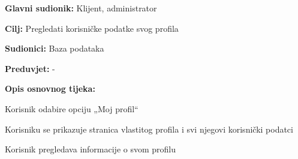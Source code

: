						\begin{packed_item}
							
							\item \textbf{Glavni sudionik: } Klijent, administrator
							\item  \textbf{Cilj:} Pregledati korisničke podatke svog profila
							\item  \textbf{Sudionici:} Baza podataka
							\item  \textbf{Preduvjet:} -
							\item  \textbf{Opis osnovnog tijeka:}
							
							\item[] \begin{packed_enum}
								
								\item Korisnik odabire opciju „Moj profil“ 
								\item Korisniku se prikazuje stranica vlastitog profila i svi njegovi korisnički podatci   
								\item Korisnik pregledava informacije o svom profilu 
							 
							\end{packed_enum}
						\end{packed_item}
						\noindent {}
